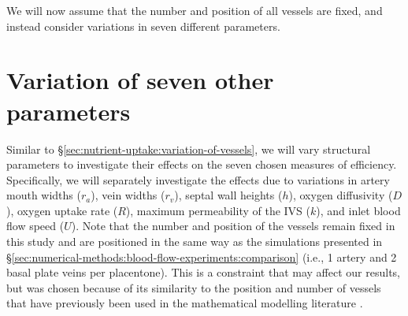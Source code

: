             


            We will now assume that the number and position of all vessels are fixed, and instead consider variations in seven different parameters.

    \section{Variation of seven other parameters} \label{sec:nutrient-uptake:variation-of-other-parameters}        
        Similar to \S\ref{sec:nutrient-uptake:variation-of-vessels}, we will vary structural parameters to investigate their effects on the seven chosen measures of efficiency. Specifically, we will separately investigate the effects due to variations in artery mouth widths ($r_a$), vein widths ($r_v$), septal wall heights ($h$), oxygen diffusivity ($D$), oxygen uptake rate ($R$), maximum permeability of the IVS ($k$), and inlet blood flow speed ($U$). Note that the number and position of the vessels remain fixed in this study and are positioned in the same way as the simulations presented in \S\ref{sec:numerical-methods:blood-flow-experiments:comparison} (i.e., 1 artery and 2 basal plate veins per placentone). This is a constraint that may affect our results, but was chosen because of its similarity to the position and number of vessels that have previously been used in the mathematical modelling literature \cite{lecarpentierComputationalFluidDynamic2016,chernyavskyMathematicalModelIntervillous2010}.
        
